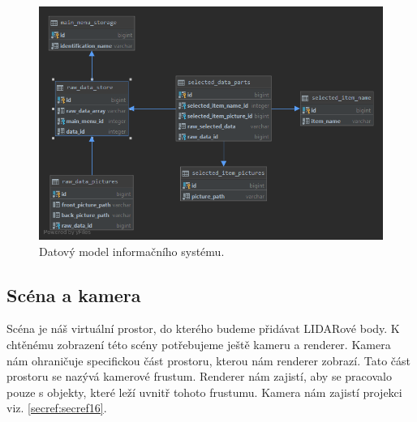 \documentclass[czech,bachelor,dept420,male,cpdeclaration]{diploma}
\begin{document}
\begin{figure}[H]
\includegraphics[width=\linewidth]{Figures/dataModel.png}
\caption{Datový model informačního systému. }
\label{fig:datamodel}
\end{figure} 



\subsection{Scéna a kamera} Scéna je náš virtuální prostor, do kterého budeme přidávat LIDARové body. K chtěnému zobrazení této scény potřebujeme ještě kameru a renderer. Kamera nám ohraničuje specifickou část prostoru, kterou nám renderer zobrazí. Tato část prostoru se nazývá kamerové frustum. Renderer nám zajistí, aby se pracovalo pouze s objekty, které leží uvnitř tohoto frustumu. Kamera nám zajistí projekci viz. \ref{secref:secref16}. 
\end{document}
